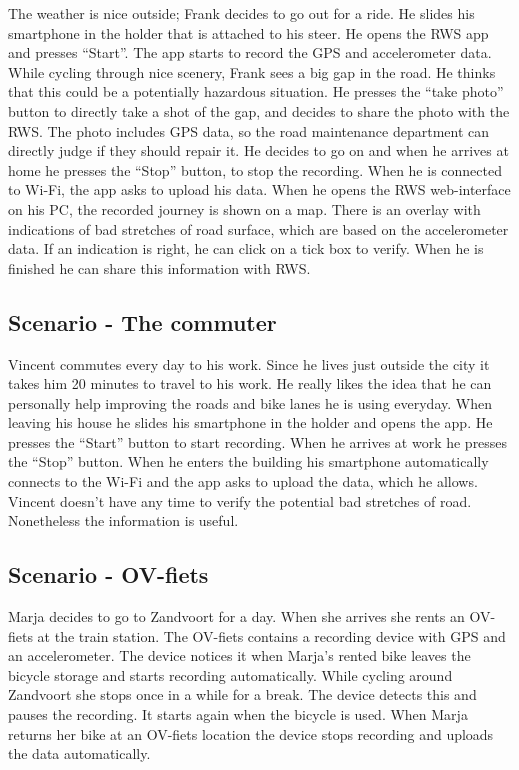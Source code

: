 \documentclass[preprint,12pt]{elsarticle}
\theoremstyle{definition}
\begin{document}
The weather is nice outside; Frank decides to go out for a ride. 
He slides his smartphone in the holder that is attached to his steer. He opens the RWS app and presses “Start”. The app starts to record the GPS and accelerometer data. 
While cycling through nice scenery, Frank sees a big gap in the road. He thinks that this could be a potentially hazardous situation. He presses the “take photo” button to directly take a shot of the gap, and decides to share the photo with the RWS. The photo includes GPS data, so the road maintenance department can directly judge if they should repair it. 
He decides to go on and when he arrives at home he presses the “Stop” button, to stop the recording. When he is connected to Wi-Fi, the app asks to upload his data.
When he opens the RWS web-interface on his PC, the recorded journey is shown on a map. There is an overlay with indications of bad stretches of road surface, which are based on the accelerometer data. If an indication is right, he can click on a tick box to verify. When he is finished he can share this information with RWS.  


\subsection{Scenario - The commuter}

Vincent commutes every day to his work. Since he lives just outside the city it takes him 20 minutes to travel to his work. He really likes the idea that he can personally help improving the roads and bike lanes he is using everyday.
When leaving his house he slides his smartphone in the holder and opens the app. He presses the “Start” button to start recording.
When he arrives at work he presses the “Stop” button. When he enters the building his smartphone automatically connects to the Wi-Fi and the app asks to upload the data, which he allows. Vincent doesn’t have any time to verify the potential bad stretches of road. Nonetheless the information is useful.


\subsection{Scenario - OV-fiets}

Marja decides to go to Zandvoort for a day. When she arrives she rents an OV-fiets at the train station.
The OV-fiets contains a recording device with GPS and an accelerometer. 
The device notices it when Marja’s rented bike leaves the bicycle storage and starts recording automatically. While cycling around Zandvoort she stops once in a while for a break. The device detects this and pauses the recording. It starts again when the bicycle is used.
When Marja returns her bike at an OV-fiets location the device stops recording and uploads the data automatically. 
\end{document}
